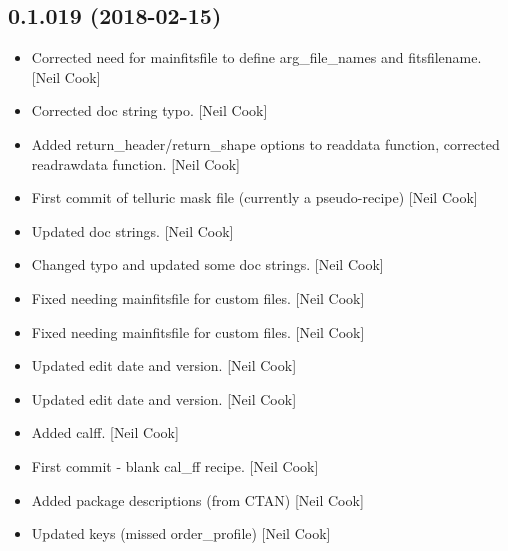 \documentclass[a4paper,10pt,english]{report}
\begin{document}
\subsection{0.1.019 (2018-02-15)}
\label{\detokenize{misc/changelog:id483}}\begin{itemize}
\item {} 
Corrected need for mainfitsfile to define arg\_file\_names and
fitsfilename. {[}Neil Cook{]}

\item {} 
Corrected doc string typo. {[}Neil Cook{]}

\item {} 
Added return\_header/return\_shape options to readdata function,
corrected readrawdata function. {[}Neil Cook{]}

\item {} 
First commit of telluric mask file (currently a pseudo-recipe) {[}Neil
Cook{]}

\item {} 
Updated doc strings. {[}Neil Cook{]}

\item {} 
Changed typo and updated some doc strings. {[}Neil Cook{]}

\item {} 
Fixed needing mainfitsfile for custom files. {[}Neil Cook{]}

\item {} 
Fixed needing mainfitsfile for custom files. {[}Neil Cook{]}

\item {} 
Updated edit date and version. {[}Neil Cook{]}

\item {} 
Updated edit date and version. {[}Neil Cook{]}

\item {} 
Added calff. {[}Neil Cook{]}

\item {} 
First commit - blank cal\_ff recipe. {[}Neil Cook{]}

\item {} 
Added package descriptions (from CTAN) {[}Neil Cook{]}

\item {} 
Updated keys (missed order\_profile) {[}Neil Cook{]}

\end{itemize}
\end{document}
